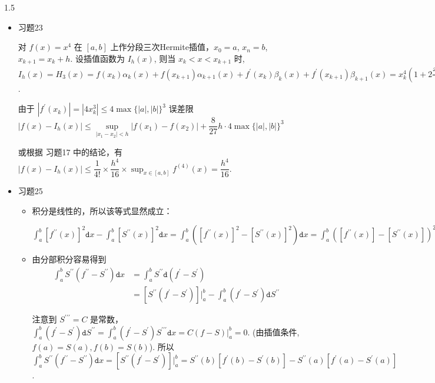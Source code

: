 \documentclass{article}
\begin{document}
\begin{spacing}{1.5}
\begin{itemize}
    \item [14.] 习题23
    
    对 $f(x)=x^4$ 在 $[a,b]$ 上作分段三次Hermite插值，$x_0 = a$, $x_n = b$, $x_{k+1} = x_k + h$. 设插值函数为 $I_h(x)$, 则当 $x_k<x<x_{k+1}$ 时, $I_h(x) = H_3(x) = f(x_k)\alpha_k(x) + f(x_{k+1})\alpha_{k+1}(x) + f^\prime(x_k)\beta_k(x) + f^\prime(x_{k+1})\beta_{k+1}(x) = x_k^4\left(1+2\dfrac{x-x_k}{h}\right)\left(\dfrac{x-x_{k+1}}{h}\right)^2 + x_{k+1}^4\left(1-2\dfrac{x-x_{k+1}}{h}\right)\left(\dfrac{x-x_k}{h}\right)^2+4x_k^3(x-x_k)\left(\dfrac{x - x_{k+1}}{h}\right)^2 + 4x_{k+1}^3(x - x_{k+1})\left(\dfrac{x-x_k}{h}\right)^2$.
    
    由于 $|f^\prime(x_k)| = |4x_k^3| \leq 4 \max\{|a|, |b|\}^3$
    误差限 $|f(x) - I_h(x)| \leq \sup\limits_{|x_1-x_2|<h} |f(x_1) - f(x_2)| + \dfrac{8}{27} h\cdot 4\max\{|a|, |b|\}^3$

    或根据 习题17 中的结论，有 $|f(x) - I_h(x)| \leq \dfrac{1}{4!}\times \dfrac{h^4}{16}\times \sup_{x\in[a,b]}f^{(4)}(x) = \dfrac{h^4}{16}$.

    \item [15.] 习题25
    
    \begin{itemize}
        \item [(1)]
        积分是线性的，所以该等式显然成立：
        
        $\int_a^b[f^{\prime\prime}(x)]^2 \mathtt{d}x - \int_a^b[S^{\prime\prime}(x)]^2\mathtt{d}x = \int_a^b \left([f^{\prime\prime}(x)]^2-[S^{\prime\prime}(x)]^2 \right)\mathtt{d}x = \int_a^b \left([f^{\prime\prime}(x)]-[S^{\prime\prime}(x)] \right)^2 + 2S^{\prime\prime}(x)[f^{\prime\prime}(x) - S^{\prime\prime}(x)]\mathtt{d}x = \int_a^b [f^{\prime\prime}(x) - S^{\prime\prime}(x)]^2\mathtt{d}x + 2\int_a^b S^{\prime\prime}(x)[f^{\prime\prime}(x) - S^{\prime\prime}(x)]\mathtt{d}x$

        \item [(2)]
        由分部积分容易得到 
        $$\begin{array}{ll}\int_a^b S^{\prime\prime}(f^{\prime\prime} - S^{\prime\prime})\mathtt{d} x &= \int_a^b S^{\prime\prime} \mathtt{d}\left(f^\prime - S^\prime\right) \\&= [S^{\prime\prime}(f^\prime-S^\prime)]|_a^b - \int_a^b (f^\prime - S^\prime) \mathtt{d} S^{\prime\prime} \end{array}$$

        注意到 $S^{\prime\prime\prime} = C$ 是常数， $\int_a^b (f^\prime - S^\prime) \mathtt{d} S^{\prime\prime} = \int_a^b (f^\prime - S^\prime) S^{\prime\prime\prime} \mathtt{d}x = C(f - S)|_a^b = 0$. (由插值条件, $f(a) = S(a), f(b) = S(b)$).
        所以 $\int_a^b S^{\prime\prime}(f^{\prime\prime} - S^{\prime\prime})\mathtt{d} x = [S^{\prime\prime}(f^\prime-S^\prime)]|_a^b = S^{\prime\prime}(b)[f^\prime(b) - S^\prime(b)] - S^{\prime\prime}(a)[f^\prime(a) - S^\prime(a)]$.

    \end{itemize}
\end{itemize}
\end{spacing}
\end{document}
